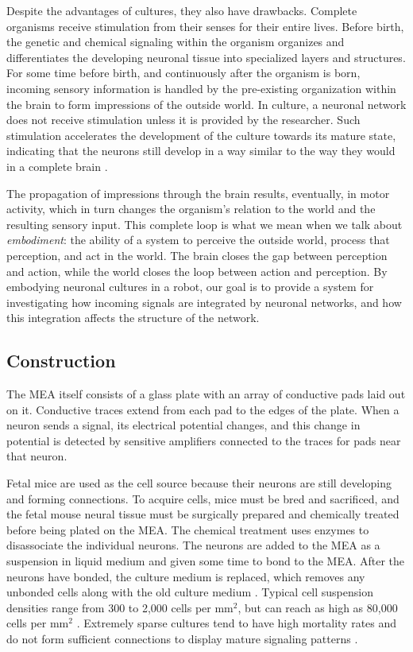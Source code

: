 \documentclass[letterpaper]{article}
\begin{document}
Despite the advantages of cultures, they also have drawbacks. 
Complete organisms receive stimulation from their senses for their entire lives. 
Before birth, the genetic and chemical signaling within the organism organizes and differentiates the developing neuronal tissue into specialized layers and structures. 
For some time before birth, and continuously after the organism is born, incoming sensory information is handled by the pre-existing organization within the brain to form impressions of the outside world. 
In culture, a neuronal network does not receive stimulation unless it is provided by the researcher. 
Such stimulation accelerates the development of the culture towards its mature state, indicating that the neurons still develop in a way similar to the way they would in a complete brain \cite{zemianek2012accelerated}.

The propagation of impressions through the brain results, eventually, in motor activity, which in turn changes the organism's relation to the world and the resulting sensory input. 
This complete loop is what we mean when we talk about \textit{embodiment}: the ability of a system to perceive the outside world, process that perception, and act in the world. 
The brain closes the gap between perception and action, while the world closes the loop between action and perception. 
By embodying neuronal cultures in a robot, our goal is to provide a system for investigating how incoming signals are integrated by neuronal networks, and how this integration affects the structure of the network. 

\subsection{Construction}
The MEA itself consists of a glass plate with an array of conductive pads laid out on it. 
Conductive traces extend from each pad to the edges of the plate. 
When a neuron sends a signal, its electrical potential changes, and this change in potential is detected by sensitive amplifiers connected to the traces for pads near that neuron.

Fetal mice are used as the cell source because their neurons are still developing and forming connections. 
To acquire cells, mice must be bred and sacrificed, and the fetal mouse neural tissue must be surgically prepared and chemically treated before being plated on the MEA. 
The chemical treatment uses enzymes to disassociate the individual neurons. 
The neurons are added to the MEA as a suspension in liquid medium and given some time to bond to the MEA.
After the neurons have bonded, the culture medium is replaced, which removes any unbonded cells along with the old culture medium \cite{wagenaar2006extremely}.
Typical cell suspension densities range from 300 to 2,000 cells per mm$^2$, but can reach as high as 80,000 cells per mm$^2$ \cite{shea2009optimization,ruaro2005toward}.
Extremely sparse cultures tend to have high mortality rates and do not form sufficient connections to display mature signaling patterns \cite{shea2009optimization}.
\end{document}
